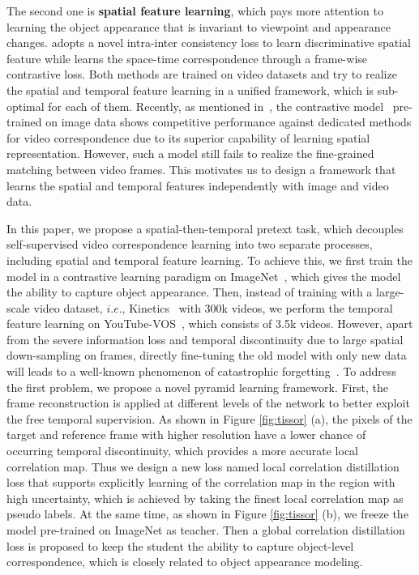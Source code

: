 \documentclass{article}
\begin{document}
The second one is \textbf{spatial feature learning}, which pays more attention to learning the object appearance that is invariant to viewpoint and appearance changes. \cite{wang2020contrastive} adopts a novel intra-inter consistency loss to learn  discriminative spatial feature while \cite{xu2021rethinking} learns the space-time correspondence through a frame-wise contrastive loss. Both methods are trained on video datasets and try to realize the spatial and temporal feature learning in a unified framework, which is sub-optimal for each of them. Recently, as mentioned in~\cite{wang2021different}, the contrastive model~\cite{he2020momentum}\cite{xie2021detco} pre-trained on image data shows competitive performance against dedicated methods for video correspondence due to its superior capability of learning spatial representation. However,  such a model still fails to realize the fine-grained matching between video frames. This motivates us to design a framework that learns the spatial and temporal features independently with image and video data.  

In this paper, we propose a spatial-then-temporal pretext task, which decouples self-supervised video correspondence learning into two separate processes, including spatial and temporal feature learning. To achieve this, we first train the model in a contrastive learning paradigm on ImageNet~\cite{deng2009large}, which gives the model the ability to capture object appearance. Then, instead of training with a large-scale video dataset, $i.e.$, Kinetics~\cite{carreira2017quo} with 300k videos, we perform the temporal feature learning on YouTube-VOS~\cite{xu2018youtube}, which consists of 3.5k videos.  However, apart from the severe information loss and temporal discontinuity due to large spatial down-sampling on frames, directly fine-tuning the old model with only new data will leads to a well-known phenomenon of catastrophic forgetting~\cite{li2017learning}. To address the first problem, we propose a novel pyramid learning framework. First, the frame reconstruction is applied at different levels of the network to better exploit the free temporal supervision. As shown in Figure \ref{fig:tissor} (a), the pixels of the target and reference frame with higher resolution have a lower chance of occurring temporal discontinuity, which provides a more accurate local correlation map. Thus we design a new loss named local correlation distillation loss that supports explicitly learning of the correlation map in the region with high uncertainty, which is achieved by taking the finest local correlation map as pseudo labels. At the same time, as shown in Figure \ref{fig:tissor} (b), we freeze the model pre-trained on ImageNet as teacher. Then a global correlation distillation loss is proposed to keep the student the ability to capture object-level correspondence, which is closely related to object appearance modeling. 
\end{document}
